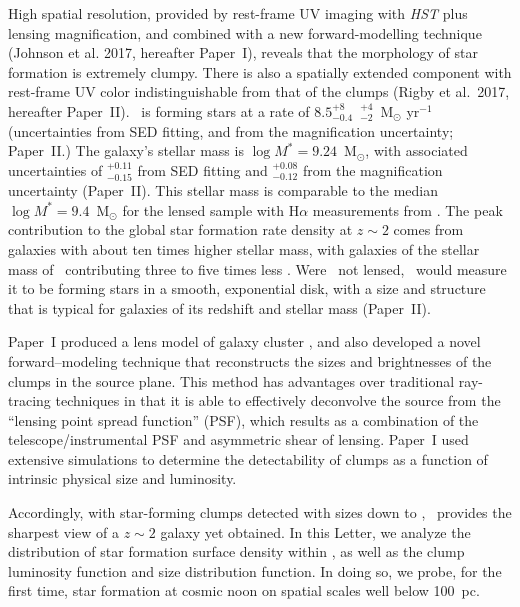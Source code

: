 High spatial resolution, provided by rest-frame UV imaging with \textit{HST} plus 
lensing magnification,  and combined with a new forward-modelling technique 
(Johnson et al. 2017, hereafter Paper~I),
reveals that the morphology of star formation is extremely clumpy.  
There is also a spatially extended component with rest-frame UV color indistinguishable 
from that of the clumps  (Rigby et al.\ 2017, hereafter Paper~II).
\arcname\ is forming stars at a rate of  $8.5$$^{+8}_{-0.4}$~$^{+4}_{-2}$~M$_{\odot}$ yr$^{-1}$ 
(uncertainties from SED fitting, and from the magnification uncertainty; Paper~II.)
The galaxy's stellar mass is $\log M^* = 9.24$~M$_\odot$, with associated uncertainties of 
 $^{+0.11}_{-0.15}$  from SED fitting and 
$^{+0.08}_{-0.12}$ from the magnification uncertainty (Paper~II).
This stellar mass is comparable to the median $\log M^* = 9.4$~M$_\odot$ for the 
lensed sample with H$\alpha$ measurements from \citet{Livermore:2015ve}.
The peak contribution to the global star formation rate density at $z\sim2$ comes 
from galaxies with about ten times higher stellar mass, with galaxies of the stellar 
mass of \arcname\ contributing three to five times less \citep{Leja:2015si}.
Were \arcname\ not lensed, \hst\ would measure it to 
be forming stars in a smooth, exponential disk, with a size and structure that is 
typical for galaxies of its redshift and stellar mass (Paper~II).

Paper~I produced a lens model of 
galaxy cluster \cluster, and also 
developed a novel forward--modeling technique that reconstructs 
the sizes and brightnesses of the clumps in the source plane.  This method has 
advantages over traditional ray-tracing techniques in that it is able 
to effectively deconvolve the source from the ``lensing point spread function'' (PSF),
which results as a combination of the telescope/instrumental PSF and
asymmetric shear of lensing.  
Paper~I used extensive simulations to determine the 
detectability of clumps as a function of intrinsic physical size and luminosity.  

Accordingly, with star-forming clumps detected with sizes down to \smallestscale, 
\arcname\ provides the sharpest view of a $z\sim2$ galaxy yet obtained.
In this Letter, %
we analyze the distribution of star formation surface density within \arcname, 
as well as the clump luminosity function and size distribution function.
In doing so, we probe, for the first time, 
star formation at cosmic noon on spatial scales well below 100~pc.

